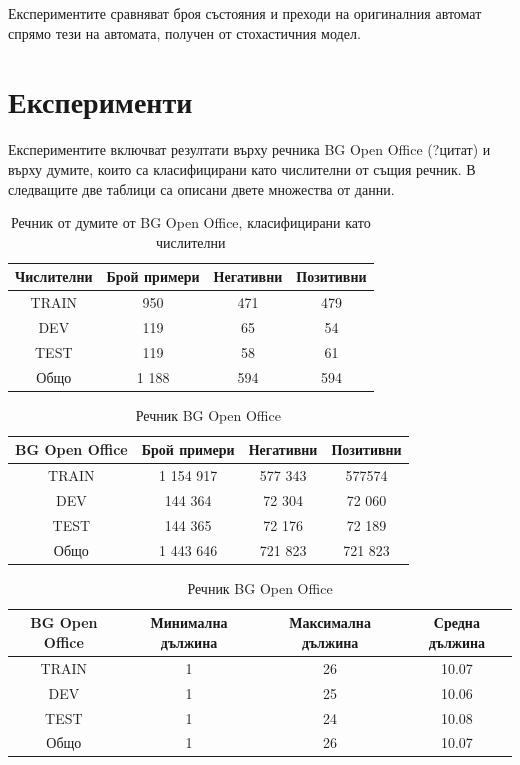 \documentclass[a4paper,12pt]{article}
\begin{document}
Експериментите сравняват броя състояния и преходи на оригиналния автомат спрямо тези на автомата, получен от стохастичния модел. 

\pagebreak

\section{Експерименти}

Експериментите включват резултати върху речника BG Open Office (?цитат) и върху думите, които са класифицирани като числителни от същия речник. В следващите две таблици са описани двете множества от данни. 

\begin{table}[h!]
\centering
\begin{tabular}{|c|c|c|c|}
\hline
Числителни & Брой примери & Негативни & Позитивни\\
\hline
TRAIN & 950 & 471 & 479\\
\hline
DEV & 119 & 65 & 54\\
\hline
TEST & 119 & 58 & 61\\
\hline
Общо & 1 188 & 594 & 594\\
\hline
\end{tabular}
\caption{Речник от думите от BG Open Office, класифицирани като числителни}
\label{table:1}
\end{table}

\begin{table}[h!]
\centering
\begin{tabular}{|c|c|c|c|}
\hline
BG Open Office & Брой примери & Негативни & Позитивни\\
\hline
TRAIN & 1 154 917 & 577 343 & 577574\\
\hline
DEV & 144 364 & 72 304 & 72 060\\
\hline
TEST & 144 365 & 72 176 & 72 189\\
\hline
Общо & 1 443 646 & 721 823 & 721 823\\
\hline
\end{tabular}
\caption{Речник BG Open Office}
\label{table:2}
\end{table}

\begin{table}[h!]
\centering
\begin{tabular}{|c|c|c|c|}
\hline
BG Open Office & Минимална дължина & Максимална дължина & Средна дължина\\
\hline
TRAIN & 1 & 26 & 10.07\\
\hline
DEV & 1 & 25 & 10.06\\
\hline
TEST & 1 & 24 & 10.08\\
\hline
Общо & 1 & 26 & 10.07\\
\hline
\end{tabular}
\caption{Речник BG Open Office}
\label{table:2}
\end{table}
\end{document}
